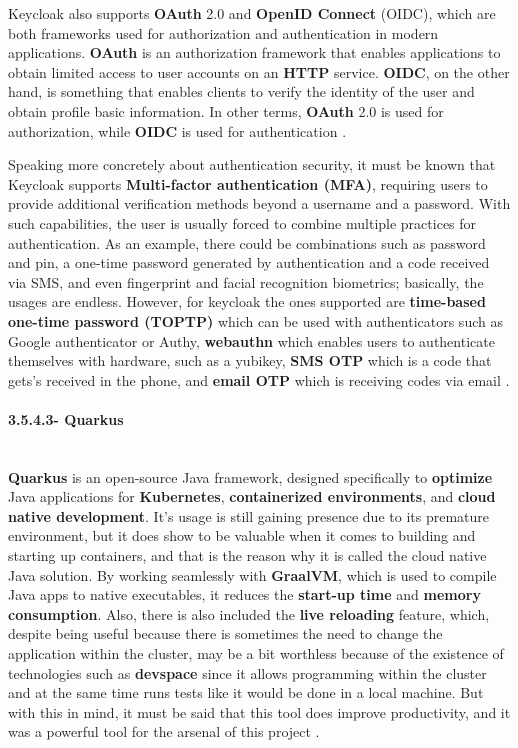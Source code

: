Keycloak also supports \textbf{OAuth} 2.0 and \textbf{OpenID Connect} (OIDC), which are both frameworks used for authorization and authentication in modern applications. \textbf{OAuth} is an authorization framework that enables applications to obtain limited access to user accounts on an \textbf{HTTP} service. \textbf{OIDC}, on the other hand, is something that enables clients to verify the identity of the user and obtain profile basic information. In other terms, \textbf{OAuth} 2.0 is used for authorization, while \textbf{OIDC} is used for authentication\cite{oauth2.0} \cite{openid} \cite{jwt}.

Speaking more concretely about authentication security, it must be known that Keycloak supports \textbf{Multi-factor authentication (MFA)}, requiring users to provide additional verification methods beyond a username and a password. With such capabilities, the user is usually forced to combine multiple practices for authentication. As an example, there could be combinations such as password and pin, a one-time password generated by authentication and a code received via SMS, and even fingerprint and facial recognition biometrics; basically, the usages are endless. However, for keycloak the ones supported are \textbf{time-based one-time password (TOPTP)} which can be used with authenticators such as Google authenticator or Authy, \textbf{webauthn} which enables users to authenticate themselves with hardware, such as a yubikey, \textbf{SMS OTP} which is a code that gets's received in the phone, and \textbf{email OTP} which is receiving codes via email \cite{MFA}.

\paragraph{3.5.4.3- Quarkus}\mbox{}\\
\textbf{Quarkus} is an open-source Java framework, designed specifically to \textbf{optimize} Java applications for \textbf{Kubernetes}, \textbf{containerized environments}, and \textbf{cloud native development}. It's usage is still gaining presence due to its premature environment, but it does show to be valuable when it comes to building and starting up containers, and that is the reason why it is called the cloud native Java solution. By working seamlessly with \textbf{GraalVM}, which is used to compile Java apps to native executables, it reduces the \textbf{start-up time} and \textbf{memory consumption}. Also, there is also included the \textbf{live reloading} feature, which, despite being useful because there is sometimes the need to change the application within the cluster, may be a bit worthless because of the existence of technologies such as \textbf{devspace} since it allows programming within the cluster and at the same time runs tests like it would be done in a local machine. But with this in mind, it must be said that this tool does improve productivity, and it was a powerful tool for the arsenal of this project \cite{quarkus} \cite{quarkus2}.

